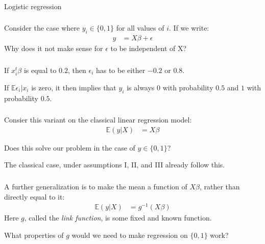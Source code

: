 \begin{frame}[fragile] \frametitle{}

\begin{flushright}
{\color{yaleblue}\sc\fontsize{1cm}{0cm}\selectfont Logistic regression}
\end{flushright}

\end{frame}

\begin{frame}[fragile] \frametitle{}

Consider the case where $y_i \in \{0,1\}$ for all values of $i$.
If we write:
\begin{align*}
y &= X \beta + \epsilon
\end{align*}
Why does it not make sense for $\epsilon$ to be independent of X?

\end{frame}

\begin{frame}[fragile] \frametitle{}

If $x_i^t \beta$ is equal to $0.2$, then $\epsilon_i$
has to be either $-0.2$ or $0.8$.

\pause If $\mathbb{E}\epsilon_i | x_i$ is zero, it then
implies that $y_i$ is always $0$ with probability $0.5$
and $1$ with probability $0.5$.

\end{frame}

\begin{frame}[fragile] \frametitle{}

Consier this variant on the classical linear regression
model:
\begin{align*}
\mathbb{E} (y | X) &= X \beta
\end{align*}

\pause Does this solve our problem in the case of $y \in \{0,1\}$?

 The classical case, under assumptions I, II, and III
already follow this.

\end{frame}

\begin{frame}[fragile] \frametitle{}

A further generalization is to make the mean a function of $X\beta$,
rather than directly equal to it:
\begin{align*}
\mathbb{E} (y | X) &= g^{-1} \left( X \beta \right)
\end{align*}
\pause Here $g$, called the \textit{link function}, is
some fixed and known function.

\pause What properties of $g$ would we need to make regression on $\{0,1\}$
work?

\end{frame}


